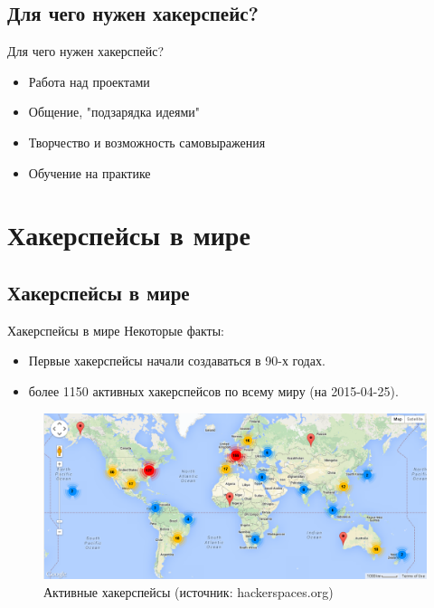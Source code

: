 \documentclass[presentation]{beamer}
\begin{document}
\subsection{Для чего нужен хакерспейс?}

\label{sec-1-2}
\begin{frame}[label=sec-1-2-1]{Для чего нужен хакерспейс?}
  \begin{itemize}
  \item \alert{Работа} над проектами
  \item \alert{Общение}, "подзарядка идеями"
  \item \alert{Творчество} и возможность самовыражения
  \item \alert{Обучение} на практике
  \end{itemize}
\end{frame}

\section{Хакерспейсы в мире}

\subsection{Хакерспейсы в мире}

\begin{frame}[label=1-3-1]{Хакерспейсы в мире}
  Некоторые факты:
  \begin{itemize}
    \item Первые хакерспейсы начали создаваться в 90-х годах.
    \item \alert{более 1150} активных хакерспейсов по всему миру (на
      2015-04-25).
  \end{itemize}
  \begin{figure}[htb]
    \centering
    \includegraphics[width=.9\linewidth]{active-hackerspaces-2015-04-25}
    \caption{Активные хакерспейсы (источник: hackerspaces.org)}
  \end{figure}
\end{frame}
\end{document}
